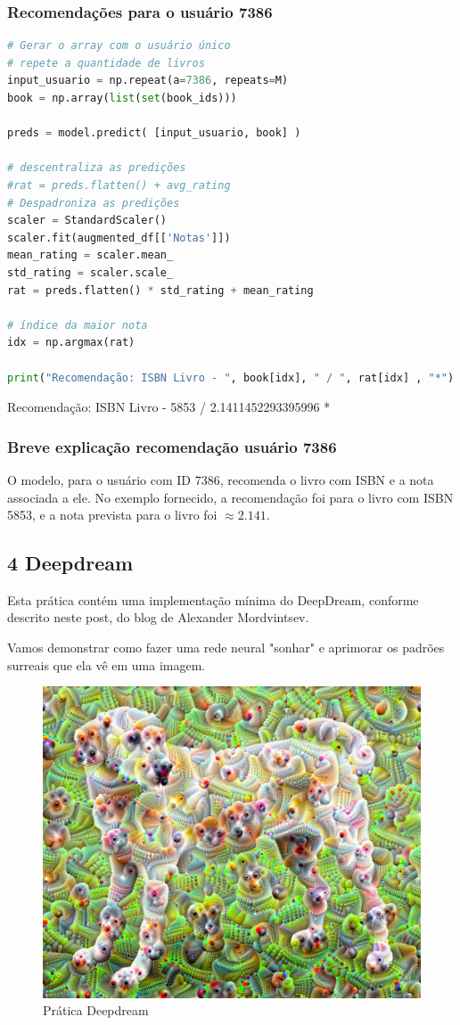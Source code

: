 \subsubsection*{Recomendações para o usuário 7386}
\begin{lstlisting}[language=Python, style=input]
# Gerar o array com o usuário único
# repete a quantidade de livros
input_usuario = np.repeat(a=7386, repeats=M)
book = np.array(list(set(book_ids)))

preds = model.predict( [input_usuario, book] )

# descentraliza as predições
#rat = preds.flatten() + avg_rating
# Despadroniza as predições
scaler = StandardScaler()
scaler.fit(augmented_df[['Notas']])
mean_rating = scaler.mean_
std_rating = scaler.scale_
rat = preds.flatten() * std_rating + mean_rating

# índice da maior nota
idx = np.argmax(rat)

print("Recomendação: ISBN Livro - ", book[idx], " / ", rat[idx] , "*")
\end{lstlisting}
\begin{tcolorbox}[myoutputstyle]
Recomendação: ISBN Livro -  5853  /  2.1411452293395996 *
\end{tcolorbox}
\subsubsection*{Breve explicação recomendação usuário 7386}
O modelo, para o usuário com ID 7386, recomenda o livro com ISBN e a nota associada a ele. No exemplo fornecido, a recomendação foi para o livro com ISBN 5853, e a nota prevista para o livro foi $\approx2.141$.

\subsection*{\textbf{4 Deepdream}}
Esta prática contém uma implementação mínima do DeepDream, conforme descrito neste post, do blog de Alexander Mordvintsev.

Vamos demonstrar como fazer uma rede neural "sonhar" e aprimorar os padrões surreais que ela vê em uma imagem.
\begin{figure}[H]
\centering
\includegraphics[width=.8\linewidth]{apendices/fig/13_IAA012_10.png}
\caption{Prática Deepdream}
\end{figure}
